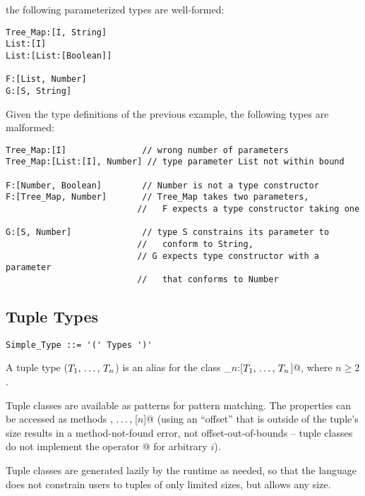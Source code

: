 the following parameterized types are well-formed: 

\begin{lstlisting}
Tree_Map:[I, String]
List:[I]
List:[List:[Boolean]]

F:[List, Number]
G:[S, String]
\end{lstlisting}

\example
\label{example:parameterized-types-mal}

Given the type definitions of the previous example, the following types are malformed: 

\begin{lstlisting}
Tree_Map:[I]               // wrong number of parameters
Tree_Map:[List:[I], Number] // type parameter List not within bound

F:[Number, Boolean]        // Number is not a type constructor
F:[Tree_Map, Number]       // Tree_Map takes two parameters, 
                          //   F expects a type constructor taking one

G:[S, Number]              // type S constrains its parameter to
                          //   conform to String, 
                          // G expects type constructor with a parameter
                          //   that conforms to Number
\end{lstlisting}





\subsection{Tuple Types}
\label{sec:tuple-types}

\syntax\begin{lstlisting}
Simple_Type ::= '(' Types ')'
\end{lstlisting}

A tuple type ($T_1 ,\, \ldots ,\, T_n$) is an alias for the class \lstinline@Tuple_$n$:[$T_1 ,\, \ldots ,\, T_n$]@, where $n \geq 2$. 

Tuple classes are available as patterns for pattern matching. The properties can be accessed as methods \lstinline@[1]$ ,\, \ldots ,\, $[$n$]@ (using an ``offset'' that is outside of the tuple's size results in a method-not-found error, not offset-out-of-bounds -- tuple classes do not implement the operator \lstinline@[i]@ for arbitrary $i$). 

Tuple classes are generated lazily by the runtime as needed, so that the language does not constrain users to tuples of only limited sizes, but allows any size. 

